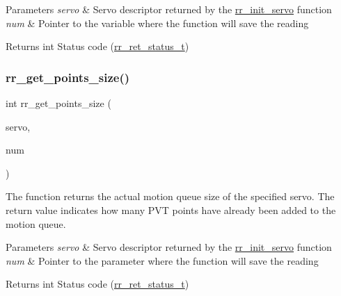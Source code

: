 \begin{DoxyParams}{Parameters}
{\em servo} & Servo descriptor returned by the \hyperlink{group___init_ga0adb313a3eeb8a4399431e940a1f3e9e}{rr\+\_\+init\+\_\+servo} function \\
\hline
{\em num} & Pointer to the variable where the function will save the reading \\
\hline
\end{DoxyParams}
\begin{DoxyReturn}{Returns}
int Status code (\hyperlink{api_8h_a92d5be5038abcf89837faf85a08debdc}{rr\+\_\+ret\+\_\+status\+\_\+t}) 
\end{DoxyReturn}
\mbox{\label{group___trajectory_gae6ed290842e08d349dd86bb1264e6a17}} 
\subsubsection{\texorpdfstring{rr\+\_\+get\+\_\+points\+\_\+size()}{rr\_get\_points\_size()}}
{\footnotesize\ttfamily int rr\+\_\+get\+\_\+points\+\_\+size (\begin{DoxyParamCaption}\item[{const \hyperlink{structrr__servo__t}{rr\+\_\+servo\+\_\+t} $\ast$}]{servo,  }\item[{uint32\+\_\+t $\ast$}]{num }\end{DoxyParamCaption})}



The function returns the actual motion queue size of the specified servo. The return value indicates how many P\+VT points have already been added to the motion queue. 


\begin{DoxyParams}{Parameters}
{\em servo} & Servo descriptor returned by the \hyperlink{group___init_ga0adb313a3eeb8a4399431e940a1f3e9e}{rr\+\_\+init\+\_\+servo} function \\
\hline
{\em num} & Pointer to the parameter where the function will save the reading \\
\hline
\end{DoxyParams}
\begin{DoxyReturn}{Returns}
int Status code (\hyperlink{api_8h_a92d5be5038abcf89837faf85a08debdc}{rr\+\_\+ret\+\_\+status\+\_\+t}) 
\end{DoxyReturn}
\mbox{\label{group___trajectory_ga0d01b53187b97dacd7611dacb37024d8}} 
